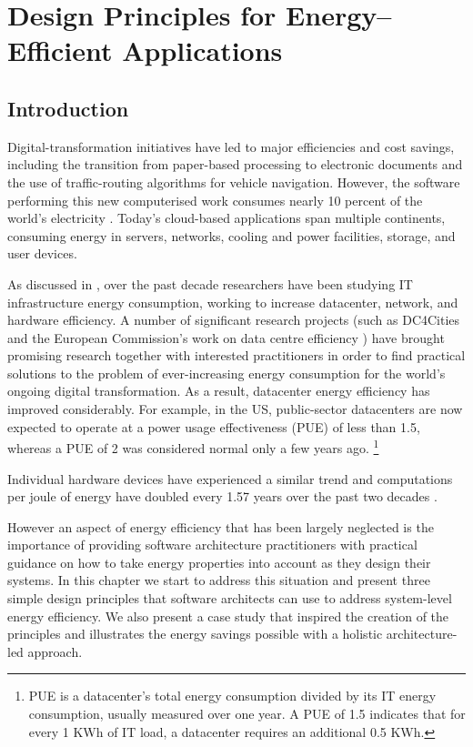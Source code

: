 \chapter{Design Principles for Energy--Efficient Applications}
\label{chapter:energydesignprinciples}

\section{Introduction}

Digital-transformation initiatives have led to major efficiencies and cost savings, including the transition from paper-based processing to electronic documents and the use of traffic-routing algorithms for vehicle navigation. However, the software performing this new computerised work consumes nearly 10 percent of the world's electricity \cite{mills2013-digital-energyusage}. Today's cloud-based applications span multiple continents, consuming energy in servers, networks, cooling and power facilities, storage, and user devices.

As discussed in , over the past decade researchers have been studying IT infrastructure energy consumption, working to increase datacenter, network, and hardware efficiency. A number of significant research projects (such as DC4Cities \cite{dc4cities2014_dcmetrics} and the European Commission's work on data centre efficiency \cite{eu2018-datacentreenergy}) have brought promising research together with interested practitioners in order to find practical solutions to the problem of ever-increasing energy consumption for the world's ongoing digital transformation.  As a result, datacenter energy efficiency has improved considerably. For example, in the US, public-sector datacenters are now expected to operate at a power usage effectiveness (PUE) of less than 1.5, whereas a PUE of 2 was considered normal only a few years ago. \footnote{PUE is a datacenter's total energy consumption divided by its IT energy consumption, usually measured over one year. A PUE of 1.5 indicates that for every 1 KWh of IT load, a datacenter requires an additional 0.5 KWh.}

Individual hardware devices have experienced a similar trend and computations per joule of energy have doubled every 1.57 years over the past two decades \cite{koomey2011-trends-energy-efficiency}. 

However an aspect of energy efficiency that has been largely neglected is the importance of providing software architecture practitioners with practical guidance on how to take energy properties into account as they design their systems.  In this chapter we start to address this situation and present three simple design principles that software architects can use to address system-level energy efficiency. We also present a case study that inspired the creation of the principles and illustrates the energy savings possible with a holistic architecture-led approach.

